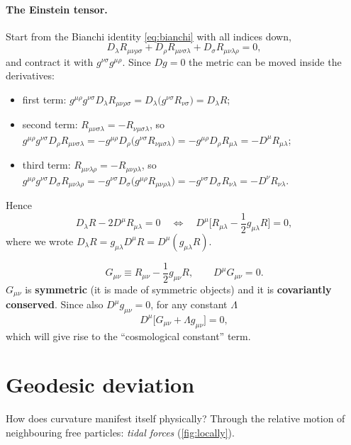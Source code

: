 \paragraph{The Einstein tensor.} Start from the Bianchi identity \eqref{eq:bianchi} with all indices down,
\[
  D_\lambda R_{\mu\nu\rho\sigma}+D_\rho R_{\mu\nu\sigma\lambda}+D_\sigma R_{\mu\nu\lambda\rho}=0,
\]
and contract it with $g^{\nu\sigma}g^{\mu\rho}$. Since $D g=0$ the metric can be moved inside the derivatives:
\begin{itemize}[nosep]
\item first term: $g^{\mu\rho}g^{\nu\sigma}D_\lambda R_{\mu\nu\rho\sigma}=D_\lambda\big(g^{\nu\sigma}R_{\nu\sigma}\big)=D_\lambda R$;
\item second term: $R_{\mu\nu\sigma\lambda}=-R_{\nu\mu\sigma\lambda}$, so $g^{\mu\rho}g^{\nu\sigma}D_\rho R_{\mu\nu\sigma\lambda}=-g^{\mu\rho}D_\rho\big(g^{\nu\sigma}R_{\nu\mu\sigma\lambda}\big)=-g^{\mu\rho}D_\rho R_{\mu\lambda}=-D^\mu R_{\mu\lambda}$;
\item third term: $R_{\mu\nu\lambda\rho}=-R_{\mu\nu\rho\lambda}$, so $g^{\mu\rho}g^{\nu\sigma}D_\sigma R_{\mu\nu\lambda\rho}=-g^{\nu\sigma}D_\sigma\big(g^{\mu\rho}R_{\mu\nu\rho\lambda}\big)=-g^{\nu\sigma}D_\sigma R_{\nu\lambda}=-D^\nu R_{\nu\lambda}$.
\end{itemize}
Hence
\[
  D_\lambda R-2D^\mu R_{\mu\lambda}=0\quad\Longleftrightarrow\quad D^\mu\Big[R_{\mu\lambda}-\frac12 g_{\mu\lambda}R\Big]=0,
\]
where we wrote $D_\lambda R=g_{\mu\lambda}D^\mu R=D^\mu(g_{\mu\lambda}R)$.

\begin{keyresult}
\begin{equation}
  G_{\mu\nu}\equiv R_{\mu\nu}-\frac12 g_{\mu\nu}R,\qquad D^\mu G_{\mu\nu}=0 .
\end{equation}
$G_{\mu\nu}$ is \textbf{symmetric} (it is made of symmetric objects) and it is \textbf{covariantly conserved}. Since also $D^\mu g_{\mu\nu}=0$, for any constant $\Lambda$
\begin{equation}
  D^\mu\big[G_{\mu\nu}+\Lambda g_{\mu\nu}\big]=0,
\end{equation}
which will give rise to the ``cosmological constant'' term.
\end{keyresult}

\section{Geodesic deviation}\label{sec:geodesic-deviation}
How does curvature manifest itself physically? Through the relative motion of neighbouring free particles: \emph{tidal forces} (\cref{fig:locally}).

